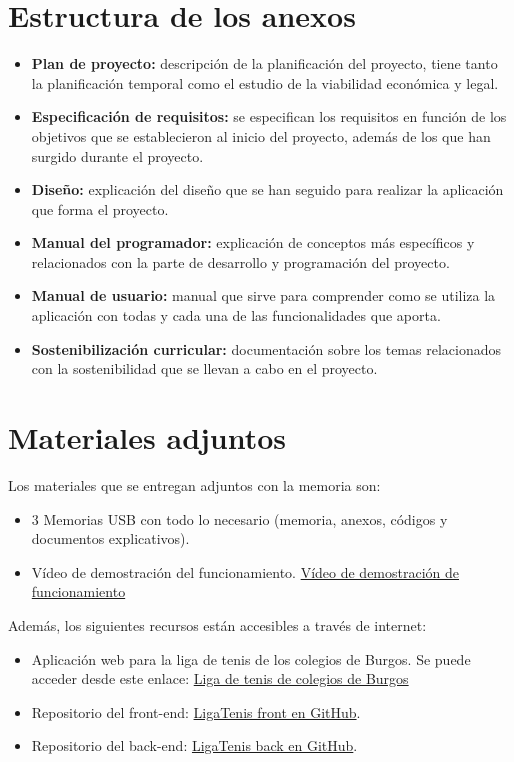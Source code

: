 \section{Estructura de los anexos}\label{estructura-anexos}

\begin{itemize}
\tightlist
\item
  \textbf{Plan de proyecto:} descripción de la planificación del proyecto, tiene tanto la planificación temporal como el estudio de la viabilidad económica y legal.
\item
  \textbf{Especificación de requisitos:} se especifican los requisitos en función de los objetivos que se establecieron al inicio del proyecto, además de los que han surgido durante el proyecto.
\item
  \textbf{Diseño:} explicación del diseño que se han seguido para realizar la aplicación que forma el proyecto.
\item
  \textbf{Manual del programador:} explicación de conceptos más específicos y relacionados con la parte de desarrollo y programación del proyecto.
\item
  \textbf{Manual de usuario:} manual que sirve para comprender como se utiliza la aplicación con todas y cada una de las funcionalidades que aporta.
\item
  \textbf{Sostenibilización curricular:} documentación sobre los temas relacionados con la sostenibilidad que se llevan a cabo en el proyecto.
\end{itemize}


\section{Materiales adjuntos}\label{materiales-adjuntos}

Los materiales que se entregan adjuntos con la memoria son: 

\begin{itemize}
\tightlist
\item
	3 Memorias USB con todo lo necesario (memoria, anexos, códigos y documentos explicativos).
\item	
	Vídeo de demostración del funcionamiento. \href{https://youtu.be/CiM1DY7O88A}{Vídeo de demostración de funcionamiento}
\end{itemize}

Además, los siguientes recursos están accesibles a través de internet:

\begin{itemize}
\tightlist
\item
Aplicación web para la liga de tenis de los colegios de Burgos.
    Se puede acceder desde este enlace: \href{http://ligatenisburgos.es/}{Liga de tenis de colegios de Burgos}

\item Repositorio del front-end: 
    \href{https://github.com/Nachoozg/tfg}{LigaTenis front en GitHub}.
    
\item Repositorio del back-end: 
    \href{https://github.com/Nachoozg/tfg-back}{LigaTenis back en GitHub}.

\end{itemize}
